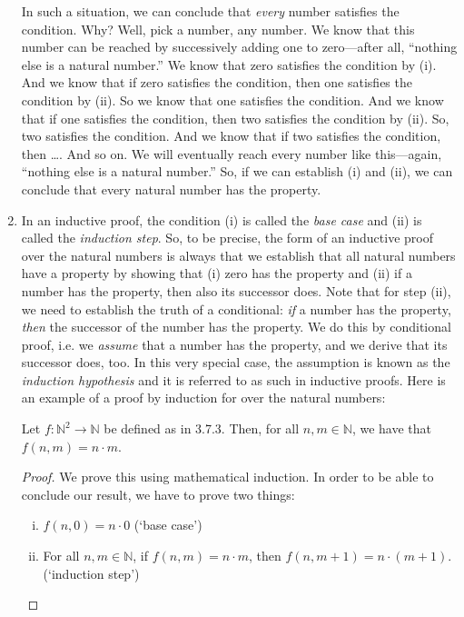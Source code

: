 \begin{enumerate}[{\thesection}.1]
\begin{enumerate}[(i)]
	\end{enumerate}
In such a situation, we can conclude that \emph{every} number satisfies the condition. Why? Well, pick a number, any number. We know that this number can be reached by successively adding one to zero---after all, ``nothing else is a natural number.'' We know that zero satisfies the condition by (i). And we know that if zero satisfies the condition, then one satisfies the condition by (ii). So we know that one satisfies the condition. And we know that if one satisfies the condition, then two satisfies the condition by (ii). So, two satisfies the condition. And we know that if two satisfies the condition, then \dots. And so on. We will eventually reach every number like this---again, ``nothing else is a natural number.'' So, if we can establish (i) and (ii), we can conclude that every natural number has the property. 

	\item In an inductive proof, the condition (i) is called the \emph{base case} and (ii) is called the \emph{induction step}. So, to be precise, the form of an inductive proof over the natural numbers is always that we establish that all natural numbers have a property by showing that (i) zero has the property and (ii) if a number has the property, then also its successor does. Note that for step (ii), we need to establish the truth of a conditional: \emph{if} a number has the property, \emph{then} the successor of the number has the property. We do this by conditional proof, i.e. we \emph{assume} that a number has the property, and we derive that its successor does, too. In this very special case, the assumption is known as the \emph{induction hypothesis} and it is referred to as such in inductive proofs. Here is an example of a proof by induction for over the natural numbers:
	
	\begin{proposition}
	Let $f:\mathbb{N}^2\to\mathbb{N}$ be defined as in 3.7.3. Then, for all $n,m\in\mathbb{N}$, we have that $f(n,m)=n\cdot m$.
	\end{proposition}
	\begin{proof}
	We prove this using mathematical induction. In order to be able to conclude our result, we have to prove two things:
	\begin{enumerate}[(i)]
	
		\item $f(n,0)=n\cdot 0$ (`base case')
		
		\item For all $n,m\in\mathbb{N}$, if $f(n,m)=n\cdot m$, then $f(n,m+1)=n\cdot (m+1)$. (`induction step')
	

\end{enumerate}
\end{proof}
\end{enumerate}
